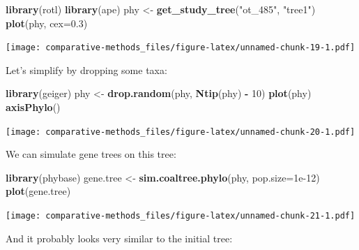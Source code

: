 \documentclass[]{article}
\newenvironment{Shaded}{\begin{snugshade}}{\end{snugshade}}
\newcommand{\DataTypeTok}[1]{\textcolor[rgb]{0.13,0.29,0.53}{#1}}
\newcommand{\DecValTok}[1]{\textcolor[rgb]{0.00,0.00,0.81}{#1}}
\newcommand{\FloatTok}[1]{\textcolor[rgb]{0.00,0.00,0.81}{#1}}
\newcommand{\KeywordTok}[1]{\textcolor[rgb]{0.13,0.29,0.53}{\textbf{#1}}}
\newcommand{\NormalTok}[1]{#1}
\newcommand{\OperatorTok}[1]{\textcolor[rgb]{0.81,0.36,0.00}{\textbf{#1}}}
\newcommand{\StringTok}[1]{\textcolor[rgb]{0.31,0.60,0.02}{#1}}
\theoremstyle{definition}
\theoremstyle{definition}
\theoremstyle{definition}
\theoremstyle{remark}
\begin{document}
\begin{Shaded}
\begin{Highlighting}[]
\KeywordTok{library}\NormalTok{(rotl)}
\KeywordTok{library}\NormalTok{(ape)}
\NormalTok{phy <-}\StringTok{ }\KeywordTok{get_study_tree}\NormalTok{(}\StringTok{"ot_485"}\NormalTok{, }\StringTok{"tree1"}\NormalTok{)}
\KeywordTok{plot}\NormalTok{(phy, }\DataTypeTok{cex=}\FloatTok{0.3}\NormalTok{)}
\end{Highlighting}
\end{Shaded}

\texttt{[image: comparative-methods\_files/figure-latex/unnamed-chunk-19-1.pdf]}

Let's simplify by dropping some taxa:

\begin{Shaded}
\begin{Highlighting}[]
\KeywordTok{library}\NormalTok{(geiger)}
\NormalTok{phy <-}\StringTok{ }\KeywordTok{drop.random}\NormalTok{(phy, }\KeywordTok{Ntip}\NormalTok{(phy) }\OperatorTok{-}\StringTok{ }\DecValTok{10}\NormalTok{)}
\KeywordTok{plot}\NormalTok{(phy)}
\KeywordTok{axisPhylo}\NormalTok{()}
\end{Highlighting}
\end{Shaded}

\texttt{[image: comparative-methods\_files/figure-latex/unnamed-chunk-20-1.pdf]}

We can simulate gene trees on this tree:

\begin{Shaded}
\begin{Highlighting}[]
\KeywordTok{library}\NormalTok{(phybase)}
\NormalTok{gene.tree <-}\StringTok{ }\KeywordTok{sim.coaltree.phylo}\NormalTok{(phy, }\DataTypeTok{pop.size=}\FloatTok{1e-12}\NormalTok{)}
\KeywordTok{plot}\NormalTok{(gene.tree)}
\end{Highlighting}
\end{Shaded}

\texttt{[image: comparative-methods\_files/figure-latex/unnamed-chunk-21-1.pdf]}

And it probably looks very similar to the initial tree:

\begin{Shaded}
\end{Shaded}
\end{document}
